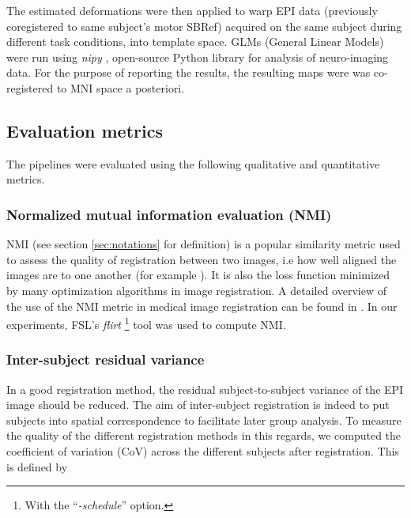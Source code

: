 The estimated
deformations were then applied to warp EPI data (previously
coregistered to same subject's motor SBRef) acquired on the same
subject during different task conditions, into template space.
GLMs (General Linear Models) \citep{friston1994statistical} were run
using \textit{nipy} \citep{Gorgolewski2011}, open-source Python library for analysis of neuro-imaging data. For the purpose of reporting the results, the resulting maps were was co-registered to
MNI space a posteriori.

\subsection{Evaluation metrics}
The pipelines were evaluated using the following qualitative and quantitative
metrics.


\subsubsection{Normalized mutual information evaluation (NMI)}
NMI (see section \ref{sec:notations} for definition) is a
popular similarity metric used to assess the quality of
registration between two images, i.e how well aligned the images are to one another
(for example \citep{maes1997multimodality}). It is also the loss function minimized by many
optimization algorithms in image registration.
A detailed overview of
the use of the NMI metric in medical image registration can be found
in \citep{pluim2003}.
In our experiments, FSL's \textit{flirt} \footnote{With the
   ``\textit{-schedule}'' option.}
tool \citep{smith2004} was used to compute NMI. 


\subsubsection{Inter-subject residual variance}
In a good registration method, the residual subject-to-subject
variance of the EPI image should be reduced. The aim of
inter-subject registration is indeed to put subjects into spatial
correspondence to facilitate later group analysis. To measure the quality of
the different registration methods in this regards, we computed the
coefficient of variation (CoV) across the different subjects after registration.
This is defined by

